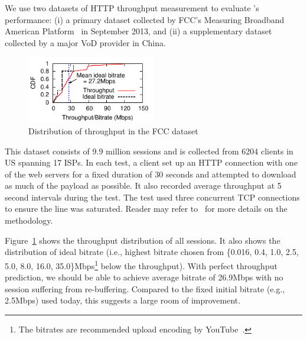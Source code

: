 We use two datasets of HTTP throughput measurement to evaluate \name's performance: (i) a primary dataset collected by FCC's Measuring Broadband American Platform~\cite{fcc-2014} in September 2013, and (ii) a supplementary dataset collected by a major VoD provider in China. 

\begin{figure}[t!]
\centering
\includegraphics[width=0.5\textwidth]{figures/dda-cdf-throughput-fcc.pdf}
\caption{Distribution of throughput in the FCC dataset}
\label{fig:cdf-throughput}
\end{figure}

 This dataset consists of 9.9 million sessions and is collected from 6204 clients in US spanning 17 ISPs. In each test, a client set up an HTTP connection with one of the web servers for a fixed duration of 30 seconds and attempted to download as much of the payload as possible. It also recorded average throughput at 5 second intervals during the test. 
The test used three concurrent TCP connections to ensure the line was saturated. 
Reader may refer to~\cite{fcc-methodology} for more details on the methodology. 

Figure~\ref{fig:cdf-throughput} shows the throughput distribution of all sessions. It also shows the distribution of ideal bitrate (i.e., highest bitrate chosen from \{0.016, 0.4, 1.0, 2.5, 5.0, 8.0, 16.0, 35.0\}Mbps\footnote{The bitrates are recommended upload encoding by YouTube~\cite{youtube-bitrates}.} below the throughput). With perfect throughput prediction, we should be able to achieve average bitrate of 26.9Mbps with no session suffering from re-buffering. Compared to the fixed initial bitrate (e.g., 2.5Mbps) used today, this suggests a large room of improvement.


